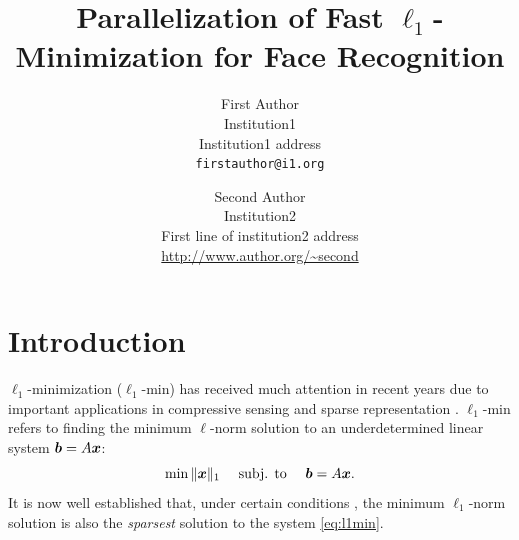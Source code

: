 \documentclass[10pt,twocolumn,letterpaper]{article}
\begin{document}
\title{Parallelization of Fast $\ell_1$-Minimization for Face Recognition}

\author{First Author\\
Institution1\\
Institution1 address\\
{\tt\small firstauthor@i1.org}
\and
Second Author\\
Institution2\\
First line of institution2 address\\
{\small\url{http://www.author.org/~second}}
}

\maketitle

\begin{abstract}

\end{abstract}

\section{Introduction} 
$\ell_1$-minimization ($\ell_1$-min) has received much attention in recent
years due to important applications in compressive sensing
\cite{BrucksteinA2007} and sparse representation \cite{WrightJ2010-PIEEE}.  
$\ell_1$-min refers to finding the minimum $\ell$-norm solution to an
underdetermined linear system ${\boldsymbol{b}}=A{\boldsymbol{x}}$:
\begin{equation}
\min \|{\boldsymbol{x}}\|_1\quad \mbox{ subj. to }\quad {\boldsymbol{b}} = A{\boldsymbol{x}}.
\label{eq:l1min}
\end{equation}
It is now well established that, under certain conditions
\cite{CandesE2005-IT_1,DonohoD2004}, the minimum $\ell_1$-norm solution is also
the \emph{sparsest} solution to the system \eqref{eq:l1min}.
\end{document}
